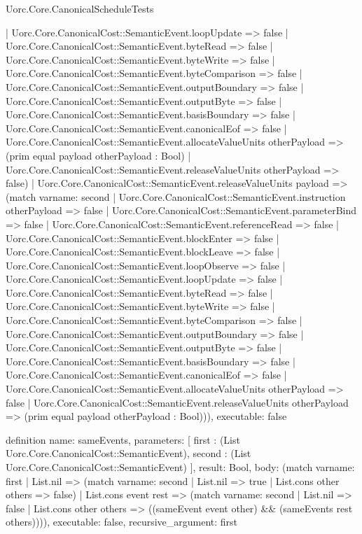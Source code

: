 \begin{lexlean}{Uorc.Core.CanonicalScheduleTests}
\begin{semanticmodule}
{      | Uorc.Core.CanonicalCost::SemanticEvent.loopUpdate => false
      | Uorc.Core.CanonicalCost::SemanticEvent.byteRead => false
      | Uorc.Core.CanonicalCost::SemanticEvent.byteWrite => false
      | Uorc.Core.CanonicalCost::SemanticEvent.byteComparison => false
      | Uorc.Core.CanonicalCost::SemanticEvent.outputBoundary => false
      | Uorc.Core.CanonicalCost::SemanticEvent.outputByte => false
      | Uorc.Core.CanonicalCost::SemanticEvent.basisBoundary => false
      | Uorc.Core.CanonicalCost::SemanticEvent.canonicalEof => false
      | Uorc.Core.CanonicalCost::SemanticEvent.allocateValueUnits otherPayload => (prim equal payload otherPayload : Bool)
      | Uorc.Core.CanonicalCost::SemanticEvent.releaseValueUnits otherPayload => false)
    | Uorc.Core.CanonicalCost::SemanticEvent.releaseValueUnits payload => (match var{name: second}
      | Uorc.Core.CanonicalCost::SemanticEvent.instruction otherPayload => false
      | Uorc.Core.CanonicalCost::SemanticEvent.parameterBind => false
      | Uorc.Core.CanonicalCost::SemanticEvent.referenceRead => false
      | Uorc.Core.CanonicalCost::SemanticEvent.blockEnter => false
      | Uorc.Core.CanonicalCost::SemanticEvent.blockLeave => false
      | Uorc.Core.CanonicalCost::SemanticEvent.loopObserve => false
      | Uorc.Core.CanonicalCost::SemanticEvent.loopUpdate => false
      | Uorc.Core.CanonicalCost::SemanticEvent.byteRead => false
      | Uorc.Core.CanonicalCost::SemanticEvent.byteWrite => false
      | Uorc.Core.CanonicalCost::SemanticEvent.byteComparison => false
      | Uorc.Core.CanonicalCost::SemanticEvent.outputBoundary => false
      | Uorc.Core.CanonicalCost::SemanticEvent.outputByte => false
      | Uorc.Core.CanonicalCost::SemanticEvent.basisBoundary => false
      | Uorc.Core.CanonicalCost::SemanticEvent.canonicalEof => false
      | Uorc.Core.CanonicalCost::SemanticEvent.allocateValueUnits otherPayload => false
      | Uorc.Core.CanonicalCost::SemanticEvent.releaseValueUnits otherPayload => (prim equal payload otherPayload : Bool))),
  executable: false
}

definition{
  name: sameEvents,
  parameters: [
    first : (List Uorc.Core.CanonicalCost::SemanticEvent),
    second : (List Uorc.Core.CanonicalCost::SemanticEvent)
  ],
  result: Bool,
  body: (match var{name: first}
    | List.nil => (match var{name: second} | List.nil => true | List.cons other others => false)
    | List.cons event rest => (match var{name: second}
      | List.nil => false
      | List.cons other others => ((sameEvent event other) && (sameEvents rest others)))),
  executable: false,
  recursive_argument: first
}


\end{semanticmodule}
\end{lexlean}
